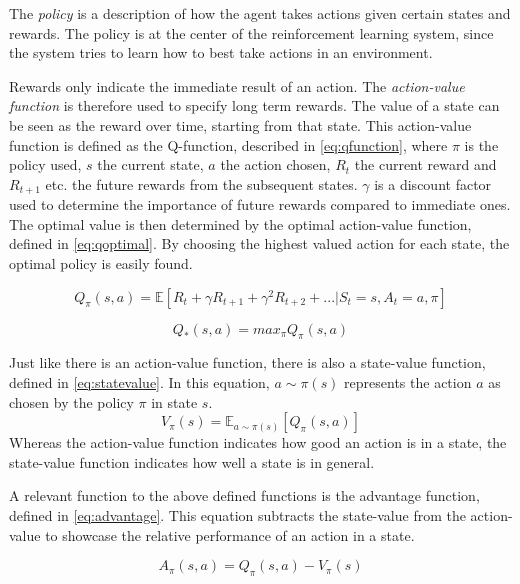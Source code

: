 \documentclass{kththesis}
\begin{document}
The \textit{policy} is a description of how the agent takes actions given certain states and rewards. The policy is at the center of the reinforcement learning system, since the system tries to learn how to best take actions in an environment. \parencite{sutton1998introduction}

Rewards only indicate the immediate result of an action. The \textit{action-value function} is therefore used to specify long term rewards. The value of a state can be seen as the reward over time, starting from that state. This action-value function is defined as the Q-function, described in \autoref{eq:qfunction}, where $\pi$ is the policy used, $s$ the current state, $a$ the action chosen, $R_t$ the current reward and $R_{t+1}$ etc. the future rewards from the subsequent states. $\gamma$ is a discount factor used to determine the importance of future rewards compared to immediate ones. The optimal value is then determined by the optimal action-value function, defined in \autoref{eq:qoptimal}. By choosing the highest valued action for each state, the optimal policy is easily found. \parencite{van2016deep}

\begin{equation}
\label{eq:qfunction}
Q_\pi(s, a) = \mathbb{E}[R_t + \gamma R_{t+1} + \gamma^2R_{t+2} + ... | S_t = s, A_t = a, \pi]
\end{equation}

\begin{equation}
\label{eq:qoptimal}
Q_*(s, a) = max_\pi Q_\pi(s, a)
\end{equation}

Just like there is an action-value function, there is also a state-value function, defined in \autoref{eq:statevalue}. In this equation, $a\sim\pi(s)$ represents the action $a$ as chosen by the policy $\pi$ in state $s$.
\begin{equation}
\label{eq:statevalue}
V_\pi(s) = \mathbb{E}_{a\sim\pi(s)}[Q_\pi(s,a)]
\end{equation}
Whereas the action-value function indicates how good an action is in a state, the state-value function indicates how well a state is in general. \parencite{wang2015dueling}

A relevant function to the above defined functions is the advantage function, defined in \autoref{eq:advantage}. This equation subtracts the state-value from the action-value to showcase the relative performance of an action in a state. \parencite{wang2015dueling}

\begin{equation}
\label{eq:advantage}
A_\pi(s,a) = Q_\pi(s,a) - V_\pi(s)
\end{equation}
\end{document}
